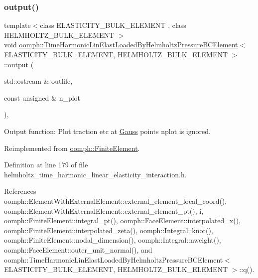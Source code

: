 \mbox{\label{classoomph_1_1TimeHarmonicLinElastLoadedByHelmholtzPressureBCElement_a2cfc5c6af366019bc8d8d9bb42ffae03}} 
\subsubsection{\texorpdfstring{output()}{output()}\hspace{0.1cm}{\footnotesize\ttfamily [2/4]}}
{\footnotesize\ttfamily template$<$class E\+L\+A\+S\+T\+I\+C\+I\+T\+Y\+\_\+\+B\+U\+L\+K\+\_\+\+E\+L\+E\+M\+E\+NT , class H\+E\+L\+M\+H\+O\+L\+T\+Z\+\_\+\+B\+U\+L\+K\+\_\+\+E\+L\+E\+M\+E\+NT $>$ \\
void \hyperlink{classoomph_1_1TimeHarmonicLinElastLoadedByHelmholtzPressureBCElement}{oomph\+::\+Time\+Harmonic\+Lin\+Elast\+Loaded\+By\+Helmholtz\+Pressure\+B\+C\+Element}$<$ E\+L\+A\+S\+T\+I\+C\+I\+T\+Y\+\_\+\+B\+U\+L\+K\+\_\+\+E\+L\+E\+M\+E\+NT, H\+E\+L\+M\+H\+O\+L\+T\+Z\+\_\+\+B\+U\+L\+K\+\_\+\+E\+L\+E\+M\+E\+NT $>$\+::output (\begin{DoxyParamCaption}\item[{std\+::ostream \&}]{outfile,  }\item[{const unsigned \&}]{n\+\_\+plot }\end{DoxyParamCaption})\hspace{0.3cm}{\ttfamily [inline]}, {\ttfamily [virtual]}}



Output function\+: Plot traction etc at \hyperlink{classoomph_1_1Gauss}{Gauss} points nplot is ignored. 



Reimplemented from \hyperlink{classoomph_1_1FiniteElement_afa9d9b2670f999b43e6679c9dd28c457}{oomph\+::\+Finite\+Element}.



Definition at line 179 of file helmholtz\+\_\+time\+\_\+harmonic\+\_\+linear\+\_\+elasticity\+\_\+interaction.\+h.



References oomph\+::\+Element\+With\+External\+Element\+::external\+\_\+element\+\_\+local\+\_\+coord(), oomph\+::\+Element\+With\+External\+Element\+::external\+\_\+element\+\_\+pt(), i, oomph\+::\+Finite\+Element\+::integral\+\_\+pt(), oomph\+::\+Face\+Element\+::interpolated\+\_\+x(), oomph\+::\+Finite\+Element\+::interpolated\+\_\+zeta(), oomph\+::\+Integral\+::knot(), oomph\+::\+Finite\+Element\+::nodal\+\_\+dimension(), oomph\+::\+Integral\+::nweight(), oomph\+::\+Face\+Element\+::outer\+\_\+unit\+\_\+normal(), and oomph\+::\+Time\+Harmonic\+Lin\+Elast\+Loaded\+By\+Helmholtz\+Pressure\+B\+C\+Element$<$ E\+L\+A\+S\+T\+I\+C\+I\+T\+Y\+\_\+\+B\+U\+L\+K\+\_\+\+E\+L\+E\+M\+E\+N\+T, H\+E\+L\+M\+H\+O\+L\+T\+Z\+\_\+\+B\+U\+L\+K\+\_\+\+E\+L\+E\+M\+E\+N\+T $>$\+::q().

